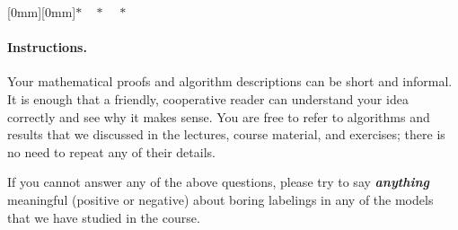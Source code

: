 \documentclass[12pt,a4paper]{article}
\newcommand{\sep}{{\centering \raisebox{-3mm}[0mm][0mm]{$*\quad*\quad*$}\par}}
\newcommand{\cemph}[1]{\textbf{\emph{\boldmath #1}}}
\begin{document}
\sep

\paragraph{Instructions.}

Your mathematical proofs and algorithm descriptions can be short and informal. It is enough that a friendly, cooperative reader can understand your idea correctly and see why it makes sense. You are free to refer to algorithms and results that we discussed in the lectures, course material, and exercises; there is no need to repeat any of their details.

If you cannot answer any of the above questions, please try to say \cemph{anything} meaningful (positive or negative) about boring labelings in any of the models that we have studied in the course.
\end{document}

